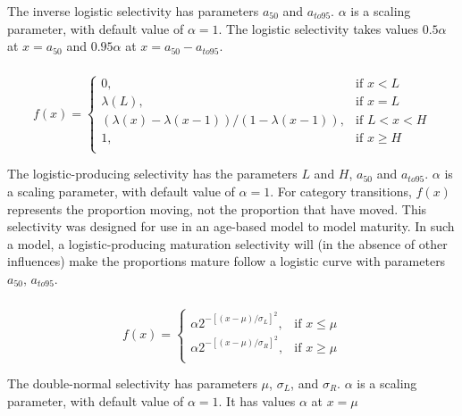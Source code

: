 The inverse logistic selectivity has parameters $a_{50}$ and $a_{to95}$. $\alpha$ is a scaling parameter, with default value of $\alpha = 1$. The logistic selectivity takes values $0.5 \alpha$ at $x=a_{50}$ and $0.95 \alpha$ at $x=a_{50}-a_{to95}$. 

\subsubsection[Logistic producing]{}

\begin{equation} 
f(x)=\begin{cases}
	  0, & \text{if $x < L$} \\
	  \lambda(L), & \text{if $x=L$} \\
	  \left( \lambda(x)-\lambda(x-1) \right) / \left( 1-\lambda(x-1) \right), & \text{if $L < x < H$} \\
	  1, & \text{if $x \ge H$} \\  
  \end{cases}
\end{equation}

The logistic-producing selectivity has the parameters $L$ and $H$, $a_{50}$ and $a_{to95}$. $\alpha$ is a scaling parameter, with default value of $\alpha = 1$. For category transitions, $f(x)$ represents the proportion moving, not the proportion that have moved. This selectivity was designed for use in an age-based model to model maturity. In such a model, a logistic-producing maturation selectivity will (in the absence of other influences) make the proportions mature follow a logistic curve with parameters $a_{50}$, $a_{to95}$.

\subsubsection[Double-normal]{}

\begin{equation}
  f(x) = \begin{cases}
    \alpha 2^{-[(x- \mu)/\sigma_L ]^2}, & \text{if $x \leq \mu$} \\
    \alpha 2^{-[(x- \mu)/\sigma_R ]^2}, & \text{if $x \ge \mu$}\\
  \end{cases}
\end{equation} 

The double-normal selectivity has parameters $\mu$, $\sigma_L$, and $\sigma_R$. $\alpha$ is a scaling parameter, with default value of $\alpha = 1$. It has values $\alpha$ at $x=\mu$

